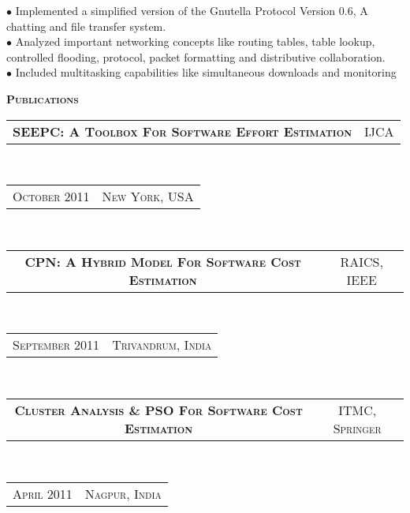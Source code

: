 \documentclass[10pt,a4paper,oneside]{article}
\begin{document}
\begin{minipage}[t]{0.63\textwidth}
\begin{adjustwidth}{7pt}{0pt}
            {\footnotesize $\bullet$ Implemented a simplified version of the
            Gnutella Protocol Version 0.6, A chatting and file transfer
            system.\\
            $\bullet$ Analyzed important networking concepts like routing tables, table lookup, controlled
            flooding, protocol, packet formatting and distributive
            collaboration.\\
            $\bullet$ Included multitasking capabilities like simultaneous
            downloads and monitoring}\\
        \end{adjustwidth}
        \textcolor{light-gray}{\textbf{\large P\textsc{ublications}}}
        \vspace{10pt}\\
        \begin{tabular}{c|c}
            \textbf{\normalsize SEEPC: A T\textsc{oolbox}
            F\textsc{or} S\textsc{oftware} E\textsc{ffort}
        E\textsc{stimation}}
            &\textmd{\normalsize IJCA}
        \end{tabular}\\
        \textcolor{light-gray}{
            \begin{tabular}{c|c}
                {\small O\textsc{ctober 2011}}
                &{\small N\textsc{ew} Y\textsc{ork}, USA}
            \end{tabular}
        \vspace{10pt}
        }\\ 
        \begin{tabular}{c|c}
            \textbf{\normalsize CPN: A H\textsc{ybrid}
            M\textsc{odel} F\textsc{or} S\textsc{oftware}
        C\textsc{ost} E\textsc{stimation}}
            &\textmd{\normalsize RAICS, IEEE}
        \end{tabular}\\
        \textcolor{light-gray}{
            \begin{tabular}{c|c}
                {\small S\textsc{eptember 2011}}
                &{\small T\textsc{rivandrum}, I\textsc{ndia}}
            \end{tabular}
            \vspace{10pt}
        }\\ 
        \begin{tabular}{c|c}
            \textbf{\normalsize C\textsc{luster} A\textsc{nalysis} \& PSO F\textsc{or} S\textsc{oftware} C\textsc{ost} E\textsc{stimation}}
            &\textmd{\normalsize ITMC, S\textsc{pringer}}
        \end{tabular}\\
        \textcolor{light-gray}{
            \begin{tabular}{c|c}
                {\small A\textsc{pril 2011}}
                &{\small N\textsc{agpur}, I\textsc{ndia}}
            \end{tabular}
        }\\ 
    \end{minipage}
\end{document}
